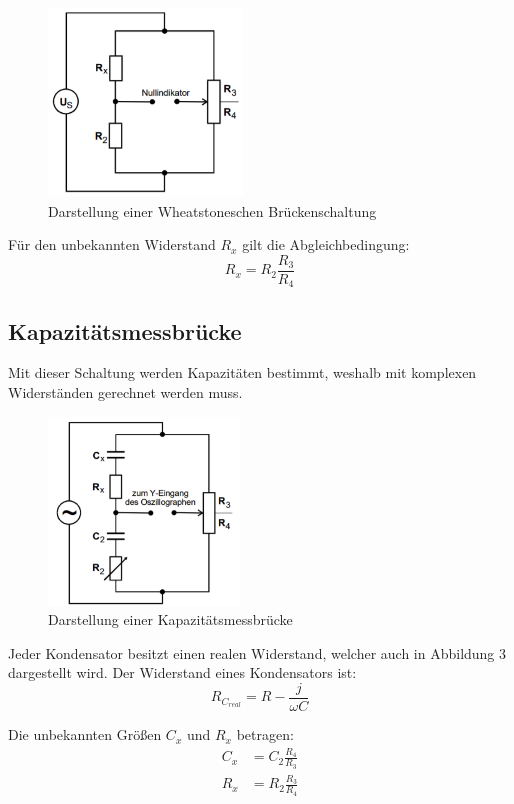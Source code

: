 \begin{figure}[H]
  \centering
  \includegraphics[height=5cm]{wheat.PNG}
  \caption{Darstellung einer Wheatstoneschen Brückenschaltung}
  \label{fig:Wheat}
\end{figure}

Für den unbekannten Widerstand $R_x$ gilt die Abgleichbedingung:
\begin{equation}
  R_x = R_2 \frac{R_3}{R_4}
\end{equation}

\subsection{Kapazitätsmessbrücke}
Mit dieser Schaltung werden Kapazitäten bestimmt, weshalb mit komplexen Widerständen gerechnet werden muss.

\begin{figure}[H]
  \centering
  \includegraphics[height=5cm]{kapazitaet.PNG}
  \caption{Darstellung einer Kapazitätsmessbrücke}
  \label{fig:kapazität}
\end{figure}

Jeder Kondensator besitzt einen realen Widerstand, welcher auch in Abbildung 3 dargestellt wird.
Der Widerstand eines Kondensators ist:
\begin{equation}
  R_{C_{real}} = R - \frac{j}{\omega C}
\end{equation}

Die unbekannten Größen $C_x$ und $R_x$ betragen:
\begin{align}
  C_x &= C_2 \frac{R_4}{R_3} \\
  R_x &= R_2 \frac{R_3}{R_4}
\end{align}

